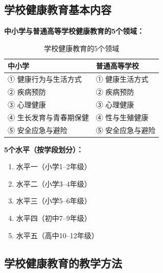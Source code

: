 \subsection{学校健康教育基本内容}

\begin{keybox}
\textbf{中小学与普通高等学校健康教育的5个领域：}

\begin{table}[H]
\centering
\caption{学校健康教育的5个领域}
\begin{tabularx}{\textwidth}{lX}
\hline
\textbf{中小学} & \textbf{普通高等学校} \\
\hline
① 健康行为与生活方式 & ① 健康生活方式 \\
② 疾病预防 & ② 疾病预防 \\
③ 心理健康 & ③ 心理健康 \\
④ 生长发育与青春期保健 & ④ 性与生殖健康 \\
⑤ 安全应急与避险 & ⑤ 安全应急与避险 \\
\hline
\end{tabularx}
\end{table}

\textbf{5个水平（按学段划分）：}
\begin{enumerate}[leftmargin=*]
    \item 水平一（小学1--2年级）
    \item 水平二（小学3--4年级）
    \item 水平三（小学5--6年级）
    \item 水平四（初中7--9年级）
    \item 水平五（高中10--12年级）
\end{enumerate}
\end{keybox}

\subsection{学校健康教育的教学方法}

